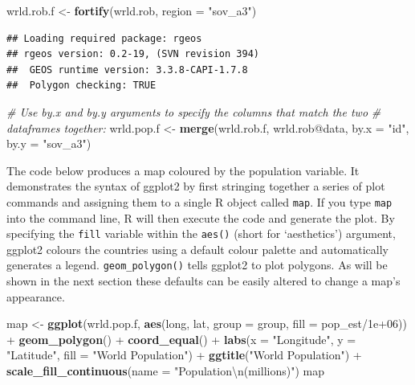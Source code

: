 \documentclass[]{article}
\newenvironment{Shaded}{}{}
\newcommand{\KeywordTok}[1]{\textcolor[rgb]{0.00,0.44,0.13}{\textbf{{#1}}}}
\newcommand{\DataTypeTok}[1]{\textcolor[rgb]{0.56,0.13,0.00}{{#1}}}
\newcommand{\FloatTok}[1]{\textcolor[rgb]{0.25,0.63,0.44}{{#1}}}
\newcommand{\CharTok}[1]{\textcolor[rgb]{0.25,0.44,0.63}{{#1}}}
\newcommand{\StringTok}[1]{\textcolor[rgb]{0.25,0.44,0.63}{{#1}}}
\newcommand{\CommentTok}[1]{\textcolor[rgb]{0.38,0.63,0.69}{\textit{{#1}}}}
\newcommand{\NormalTok}[1]{{#1}}
\begin{document}
\begin{Shaded}
\begin{Highlighting}[]
\NormalTok{wrld.rob.f <-}\StringTok{ }\KeywordTok{fortify}\NormalTok{(wrld.rob, }\DataTypeTok{region =} \StringTok{"sov_a3"}\NormalTok{)}
\end{Highlighting}
\end{Shaded}

\begin{verbatim}
## Loading required package: rgeos
## rgeos version: 0.2-19, (SVN revision 394)
##  GEOS runtime version: 3.3.8-CAPI-1.7.8 
##  Polygon checking: TRUE
\end{verbatim}

\begin{Shaded}
\begin{Highlighting}[]

\CommentTok{# Use by.x and by.y arguments to specify the columns that match the two}
\CommentTok{# dataframes together:}
\NormalTok{wrld.pop.f <-}\StringTok{ }\KeywordTok{merge}\NormalTok{(wrld.rob.f, wrld.rob@data, }\DataTypeTok{by.x =} \StringTok{"id"}\NormalTok{, }\DataTypeTok{by.y =} \StringTok{"sov_a3"}\NormalTok{)}
\end{Highlighting}
\end{Shaded}

The code below produces a map coloured by the population variable. It
demonstrates the syntax of ggplot2 by first stringing together a series
of plot commands and assigning them to a single R object called
\texttt{map}. If you type \texttt{map} into the command line, R will
then execute the code and generate the plot. By\\specifying the
\texttt{fill} variable within the \texttt{aes()} (short for
`aesthetics') argument, ggplot2 colours the countries using a default
colour palette and automatically generates a legend.
\texttt{geom\_polygon()} tells ggplot2 to plot polygons. As will be
shown in the next section these defaults can be easily altered to change
a map's appearance.

\begin{Shaded}
\begin{Highlighting}[]
\NormalTok{map <-}\StringTok{ }\KeywordTok{ggplot}\NormalTok{(wrld.pop.f, }\KeywordTok{aes}\NormalTok{(long, lat, }\DataTypeTok{group =} \NormalTok{group, }\DataTypeTok{fill =} \NormalTok{pop_est/}\FloatTok{1e+06}\NormalTok{)) +}\StringTok{ }
\StringTok{    }\KeywordTok{geom_polygon}\NormalTok{() +}\StringTok{ }\KeywordTok{coord_equal}\NormalTok{() +}\StringTok{ }\KeywordTok{labs}\NormalTok{(}\DataTypeTok{x =} \StringTok{"Longitude"}\NormalTok{, }\DataTypeTok{y =} \StringTok{"Latitude"}\NormalTok{, }\DataTypeTok{fill =} \StringTok{"World Population"}\NormalTok{) +}\StringTok{ }
\StringTok{    }\KeywordTok{ggtitle}\NormalTok{(}\StringTok{"World Population"}\NormalTok{) +}\StringTok{ }\KeywordTok{scale_fill_continuous}\NormalTok{(}\DataTypeTok{name =} \StringTok{"Population}\CharTok{\textbackslash{}n}\StringTok{(millions)"}\NormalTok{)}
\NormalTok{map}
\end{Highlighting}
\end{Shaded}
\end{document}
